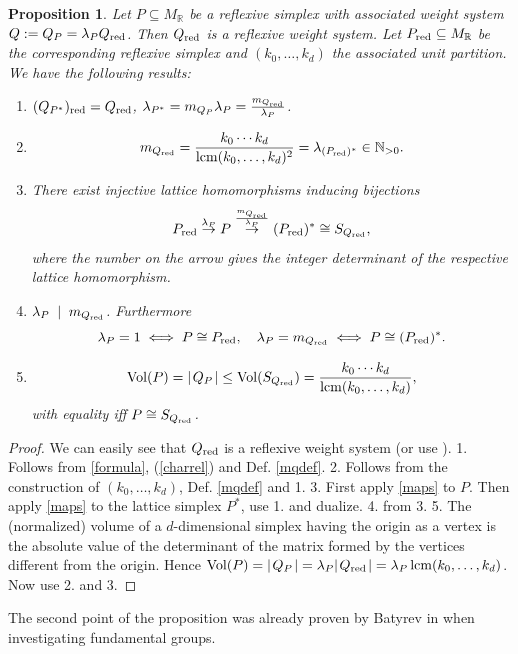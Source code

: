 \documentclass[a4paper,twoside]{article}
\newcommand{\card}[1]{{\mid\! #1 \!\mid}}
\def\lolra{\Longleftrightarrow}
\def\N{{\mathbb N}}
\def\Nspos{{\N_{>0}}}
\def\Nato{\Nspos}
\def\R{{\mathbb R}}
\def\Qred{{Q_{\rm red}}}
\def\Pred{{P_{\rm red}}}
\def\red{{\rm red}}
\def\lcm{{\rm lcm}}
\def\vol{{\rm Vol}}
\def\MR{{M_{\R}}}
\newtheorem{proposition}[theorem]{Proposition}
\begin{document}
\begin{proposition}
Let $P \subseteq \MR$ be a reflexive simplex with associated weight system $Q := Q_P = \lambda_P \Qred$. 
Then $\Qred$ is a reflexive weight system. Let $\Pred \subseteq \MR$ be the corresponding reflexive simplex 
and $(k_0, \ldots, k_d)$ the associated unit partition. 
We have the following results:

\begin{enumerate}
\item $(Q_{P^*})_\red = \Qred$, $\lambda_{P^*} = m_{Q_P} \lambda_P = \frac{m_\Qred}{\lambda_P}$.
\item \[m_\Qred = \frac{k_0 \cdots k_d}{\lcm(k_0, \ldots, k_d)^2} = \lambda_{(\Pred)^*} \in \Nato.\]
\item 
There exist injective lattice homomorphisms inducing bijections
\[\Pred \stackrel{\lambda_P}{\to} P \stackrel{\frac{m_\Qred}{\lambda_P}}{\to} (\Pred)^* \cong S_{Q_\red},\]
where the number on the arrow gives the integer determinant of the respective lattice homomorphism.
\item $\lambda_P \;\mid\; m_\Qred$. Furthermore
\[\lambda_P = 1 \;\lolra\; P \cong \Pred,\quad \lambda_P = m_\Qred \;\lolra\; P \cong (\Pred)^*.\]
\item \[\vol(P) = \card{Q_P} \leq \vol(S_{\Qred}) = \frac{k_0 \cdots k_d}{\lcm(k_0, \ldots, k_d)},\]
with equality iff $P \cong S_{\Qred}$.
\end{enumerate}
\label{refprop}
\end{proposition}

\begin{proof}

We can easily see that $\Qred$ is a reflexive weight system (or use \cite[Prop. 5.1]{Con02}). 
1. Follows from \ref{formula}, (\ref{charrel}) and Def. \ref{mqdef}.
2. Follows from the construction of $(k_0, \ldots, k_d)$, Def. \ref{mqdef} and 1. 
3. First apply \ref{maps} to $P$. Then apply \ref{maps} to the lattice simplex $P^*$, 
use 1. and dualize. 
4. from 3.  
5. The (normalized) volume of a $d$-dimensional simplex having the origin as a vertex is the 
absolute value of the determinant of the matrix formed by the vertices different from the origin. 
Hence $\vol(P) = \card{Q_P} = \lambda_P \card{\Qred} = \lambda_P \,\lcm(k_0, \ldots, k_d)$. 
Now use 2. and 3.

\end{proof}

The second point of the proposition was already proven by Batyrev in \cite[Cor. 5.5.4]{Bat94} when 
investigating fundamental groups.
\end{document}
